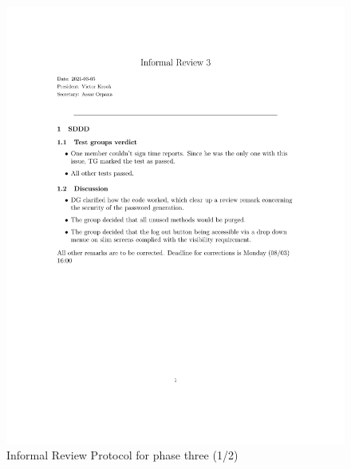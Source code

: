 \documentclass{article}
\begin{document}
 
  \begin{figure}
     \centering
     \includegraphics[width=13cm]{images/Phase3_1_2021_03_05-1}
     \renewcommand\figurename{Figure}
      \caption{Informal Review Protocol for phase three (1/2)}
     \label{fig:my_label}
 \end{figure}
 
\end{document}
